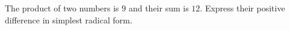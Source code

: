 The product of two numbers is $9$ and their sum is $12$. Express their positive difference in simplest radical form.
